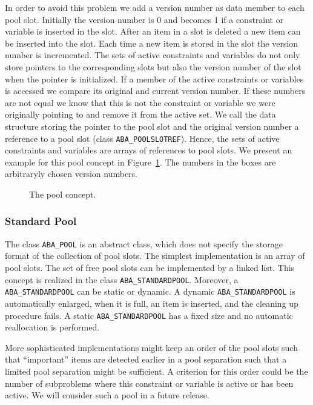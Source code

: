 In order to avoid this problem we add a version number as data member to
each pool slot. Initially the version number is 0 and becomes 1
if a constraint or variable is inserted in the slot. After an item in
a slot is deleted a new item can be inserted into the slot. Each time
a new item is stored in the slot the version number is incremented.
The sets of active constraints and variables do not only store pointers
to the corresponding slots but also the version number of the slot when
the pointer is initialized. If a member of the active constraints
or variables is accessed we compare its original and current
version number. If these numbers are not equal we know that this is not the
constraint or variable we were originally pointing to and remove it
from the active set. We call the data structure storing the pointer
to the pool slot and the original version number a 
reference to a pool slot
(class {\tt ABA\_POOLSLOTREF}). 
Hence, the sets of active constraints and variables are
arrays of references to pool slots.
We present an example for this pool concept in 
Figure~\ref{figure:pool}. The numbers in the boxes are arbitraryly chosen
version numbers.

\begin{figure}
\centerline{
}
\caption{The pool concept.}
\label{figure:pool}
\end{figure}

\subsubsection{Standard Pool}

The class {\tt ABA\_POOL} is an abstract class, which does not specify the
storage format of the collection of pool slots. The simplest 
implementation is an array of pool slots. 
The set of free pool slots can be implemented by a linked
list. This concept is realized in the 
class {\tt ABA\_STANDARDPOOL}.
Moreover, a {\tt ABA\_STANDARDPOOL} can be static or dynamic. A dynamic
{\tt ABA\_STANDARDPOOL} is automatically enlarged, when it is full, an
item is inserted, and the cleaning up procedure fails. A static 
{\tt ABA\_STANDARDPOOL} has a fixed size and no automatic reallocation is performed.

More sophisticated implementations might keep an order
of the pool slots such that ``important'' items are detected earlier
in a pool separation such that a limited pool separation might be
sufficient. A criterion for this order could be the number of 
subproblems where this constraint or variable is active or has been 
active. We will consider such a pool in a future release.

